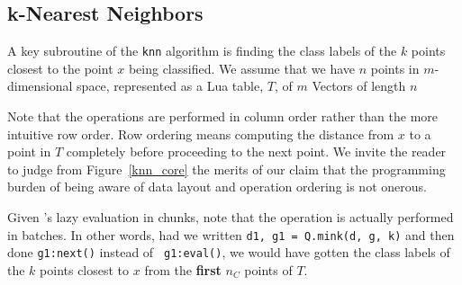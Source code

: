 \subsection{k-Nearest Neighbors}
\label{knn}

A key subroutine of the {\tt knn} algorithm \cite{Hastie2009} is finding the class labels of the
\(k\) points closest to the point \(x\) being classified. 
We assume that we have \(n\) points in \(m\)-dimensional space, represented as a
Lua table, \(T\), of \(m\) Vectors of length \(n\)

Note that the operations are performed in column
order rather than the more intuitive row order. Row ordering means computing the
distance from \(x\) to a point in \(T\) completely before proceeding to the next
point. We invite the reader to judge from Figure~\ref{knn_core} the merits of our claim that the programming burden of being aware of data layout and
operation ordering is not onerous.

Given \Q's lazy evaluation in chunks, note that the operation is actually
performed in batches. In other words, had we written 
{\tt d1, g1 = Q.mink(d, g, k)} and then done {\tt g1:next()} instead  of {\tt
g1:eval()}, 
we would have gotten the class labels of the \(k\) points
closest to \(x\) from the {\bf first} \(n_C\) points of \(T\). 

\begin{figure}[hbtp]
\centering
{}
\end{figure}


